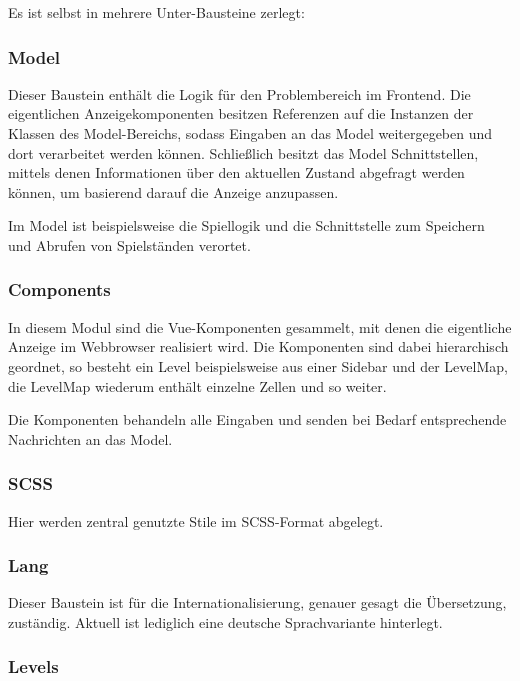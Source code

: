 \documentclass[letterpaper, 10 pt, conference]{ieeeconf}
\begin{document}
Es ist selbst in mehrere Unter-Bausteine zerlegt:

\subsubsection{Model}

Dieser Baustein enthält die Logik für den Problembereich im Frontend.
Die eigentlichen Anzeigekomponenten besitzen Referenzen auf die Instanzen der Klassen des Model-Bereichs,
sodass Eingaben an das Model weitergegeben und dort verarbeitet werden können.
Schließlich besitzt das Model Schnittstellen, mittels denen Informationen über den aktuellen Zustand abgefragt werden können,
um basierend darauf die Anzeige anzupassen.

Im Model ist beispielsweise die Spiellogik und die Schnittstelle zum Speichern und Abrufen von Spielständen verortet.

\subsubsection{Components}

In diesem Modul sind die Vue-Komponenten gesammelt, mit denen die eigentliche Anzeige im Webbrowser realisiert wird.
Die Komponenten sind dabei hierarchisch geordnet, so besteht ein Level beispielsweise aus einer Sidebar und der LevelMap,
die LevelMap wiederum enthält einzelne Zellen und so weiter.

Die Komponenten behandeln alle Eingaben und senden bei Bedarf entsprechende Nachrichten an das Model.

\subsubsection{SCSS}

Hier werden zentral genutzte Stile im SCSS-Format abgelegt.

\subsubsection{Lang}

Dieser Baustein ist für die Internationalisierung, genauer gesagt die Übersetzung, zuständig.
Aktuell ist lediglich eine deutsche Sprachvariante hinterlegt.

\subsubsection{Levels}
\end{document}
